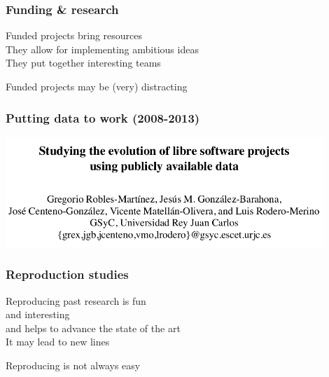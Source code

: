\documentclass[17pt,aspectratio=169,hyperref=pdfusetitle]{beamer}
\begin{document}
\begin{frame}[fragile]
  \frametitle{Funding \& research}

  Funded projects bring resources \\
  They allow for implementing ambitious ideas \\
  They put together interesting teams \\
  
  \begin{center}
    Funded projects may be (very) distracting
  \end{center}  
  
\end{frame}



\begin{frame}[fragile]
  \frametitle{Putting data to work (2008-2013)}

  \begin{center}
  \includegraphics[width=12cm]{figs/evolution-data}
  \end{center}  
  
\end{frame}

\begin{frame}[fragile]
  \frametitle{Reproduction studies}

  Reproducing past research is fun \\
  and interesting \\
  and helps to advance the state of the art \\
  It may lead to new lines \\
  
  \begin{center}
    Reproducing is not always easy
  \end{center}  
  
\end{frame}
\end{document}
